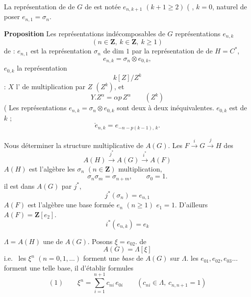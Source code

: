 \documentclass[11pt,a4paper]{article}
\begin{document}
La représentation de \ill{} \ill{} de $G$ \ill{} \ill{} de \ill{} est notée
$e_{n,k+1}$ $(k+1 \geq 2)$ ( \ill{} \ill{} \ill{} \ill{} \ill{}, \ill{} \ill{}
\ill{} $k = 0$, \ill{} \ill{} naturel de poser $e_{n,1} = \sigma_{n}$.


\textbf{Proposition} Les représentations indécomposables de $G$ \ill{}
\struck{\ill{}}  représentations
$e_{n,k}$ \struck{\ill{}}
\[ ( n \in \mathbf{Z} , \ k \in \mathbf{Z} , \ k \geq 1 ) \]
\ill{} \ill{} de  : \struck{\ill{}} $e_{n,1}$ est la
représentation $\sigma_{n}$ de dim $1$  par la
représentation de \ill{} \ill{} de $H = C^{*}$,
\[ e_{n,k} = \sigma_{n} \otimes e_{0,k} , \]
\ill{} $e_{0,k}$ \ill{} la représentation \ill{} \ill{} \ill{}
\[ k[Z]/Z^{k} \]
 \ill{} : $X$ \ill{} l' de
multiplication par $Z$ \ill{} $(Z^{k})$, et
\[ Y . Z^{\alpha} = \alpha p\, Z^{\alpha} \qquad (Z^{k}) \]
( Les représentations $e_{n,k} = \sigma_{n} \otimes e_{0,k}$ sont deux à deux
inéquivalentes. $e_{0,k}$ est de \ill{} \ill{} $k$ ;
\[ \check{e}_{n,k} = e_{-n-p(k-1),\, k} . \]


Nous \ill{} déterminer la structure multiplicative de $A(G)$. Les \ill{}
$F \xrightarrow{\ i\ } G \xrightarrow{\ j\ } H$ \ill{} des 
\[ A(H) \xrightarrow{\ j^{*}\ } A(G) \xrightarrow{\ i^{*}\ } A(F) \]
$A(H)$ est l'algèbre \struck{\ill{}}  \ill{} les
$\sigma_{n}$ $(n \in \mathbf{Z})$ \ill{} \ill{} multiplication,
\[ \sigma_{n} \sigma_{m} = \sigma_{n+m} , \qquad \sigma_{0} = 1 . \]
il est  dans $A(G)$ par $j^{*}$, \ill{}
\[ j^{*}(\sigma_{n}) = e_{n,1} \]
$A(F)$ est l'algèbre \struck{\ill{}} \ill{} \ill{} une base formée \ill{}
\ill{} $e_{n}$ $(n \geq 1)$ \ill{} $e_{1} = 1$. D'ailleurs
$A(F) = \mathbf{Z}[e_{2}]$. \ill{}
\[ i^{*}(e_{n,k}) = e_{k} \]

 $\Lambda = A(H)$ \ill{} une \ill{} de $A(G)$. Posons
$\xi = e_{02}$. \ill{} \ill{} de  \ill{}
\[ A(G) = \Lambda[\xi] \]
i.e.\ \ill{} les $\xi^{n}$ $( n = 0, 1, \ldots )$ forment une \emph{base} de
$A(G)$ sur $\Lambda$. \ill{} les $e_{01}, e_{02}, e_{03} \ldots$ forment une
telle base, \ill{} il  d'établir \ill{} \ill{} formules
\begin{equation*}
(1) \qquad \xi^{n} = \sum_{i=1}^{n+1} c_{ni}\, e_{0i} \qquad
   ( c_{ni} \in \Lambda , \ c_{n,n+1} = 1 )
\end{equation*}
\end{document}
